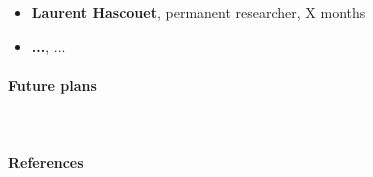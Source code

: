 \begin{refsection}
\begin{itemize}
	\item {\bf Laurent Hascouet}, permanent researcher, X months
	\item {\bf ...}, ...
\end{itemize}


\paragraph{Future plans}~\\


\paragraph{References}~\\


\printbibliography[heading=none,notkeyword=own]
\end{refsection}
